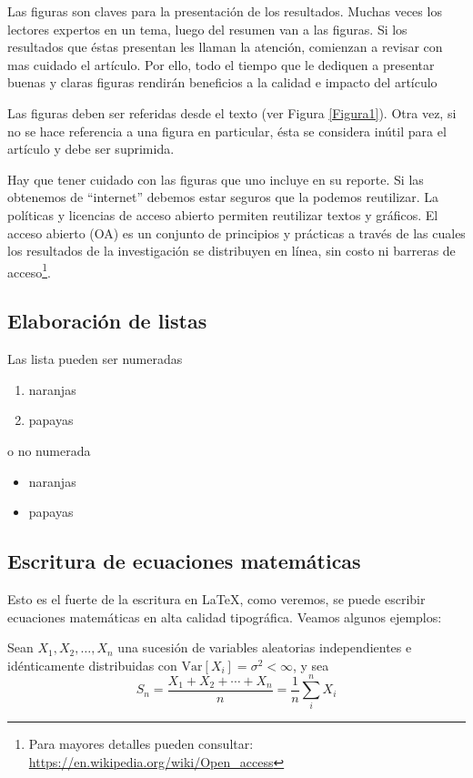 \documentclass[spanish,notitlepage,letterpaper,11pt]{article} %
\begin{document}
Las figuras son claves para la presentación de los resultados. Muchas veces los lectores expertos en un tema, luego del resumen van a las figuras. Si los resultados que éstas presentan les llaman la atención, comienzan a revisar con mas cuidado el artículo. Por ello, todo el tiempo que le dediquen a presentar buenas y claras figuras rendirán beneficios a la calidad e impacto del artículo 

Las figuras deben ser referidas desde el texto (ver Figura \ref{Figura1}). Otra vez, si no se hace referencia a una figura en particular, ésta se considera inútil para el artículo y debe ser suprimida.

Hay que tener cuidado con las figuras que uno incluye en su reporte. Si las obtenemos de ``internet'' debemos estar seguros que la podemos reutilizar. La políticas y licencias de acceso abierto permiten reutilizar textos y gráficos. El acceso abierto (OA) es un conjunto de principios y prácticas a través de las cuales los resultados de la investigación se distribuyen en línea, sin costo ni barreras de acceso\footnote{Para mayores detalles pueden consultar:  \url{https://en.wikipedia.org/wiki/Open_access}}.


\subsection*{Elaboración de listas}
Las lista pueden ser numeradas
\begin{enumerate}
\item naranjas
\item papayas
\end{enumerate}

o no numerada
\begin{itemize}
\item naranjas
\item papayas
\end{itemize}

\subsection*{Escritura de ecuaciones matemáticas}
Esto es el fuerte de la escritura en \LaTeX{}, como veremos, se puede escribir ecuaciones matemáticas en alta calidad tipográfica. Veamos algunos ejemplos:

Sean $X_1, X_2, \ldots, X_n$ una sucesión  de variables aleatorias independientes e idénticamente distribuidas con $\text{Var}[X_i] = \sigma^2 < \infty$, y sea
$$
S_n = \frac{X_1 + X_2 + \cdots + X_n}{n} = \frac{1}{n}\sum_{i}^{n} X_i
$$
\end{document}

